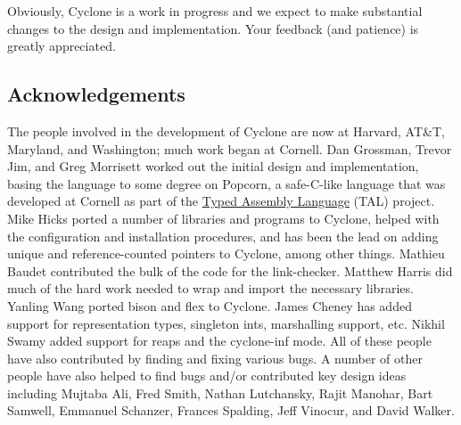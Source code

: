 Obviously, Cyclone is a work in progress and we expect to make
substantial changes to the design and implementation.  Your feedback
(and patience) is greatly appreciated.

\subsection{Acknowledgements}

The people involved in the development of Cyclone are now at Harvard,
AT\&T\@, Maryland, and Washington; much work began at Cornell.  Dan
Grossman, Trevor Jim, and Greg Morrisett worked out the initial design
and implementation, basing the language to some degree on Popcorn, a
safe-C-like language that was developed at Cornell as part of the
\href{http://www.cs.cornell.edu/talc}{Typed Assembly Language} (TAL)
project.  Mike Hicks ported a number of libraries and programs to
Cyclone, helped with the configuration and installation procedures,
and has been the lead on adding unique and reference-counted pointers
to Cyclone, among other things.  Mathieu Baudet contributed the bulk
of the code for the link-checker.  Matthew Harris did much of the hard
work needed to wrap and import the necessary libraries.  Yanling Wang
ported bison and flex to Cyclone.  James Cheney has added support for
representation types, singleton ints, marshalling support, etc. Nikhil
Swamy added support for reaps and the cyclone-inf mode. All of these
people have also contributed by finding and fixing various bugs.  A
number of other people have also helped to find bugs and/or
contributed key design ideas including Mujtaba Ali, Fred Smith, Nathan
Lutchansky, Rajit Manohar, Bart Samwell, Emmanuel Schanzer, Frances
Spalding, Jeff Vinocur, and David Walker.

